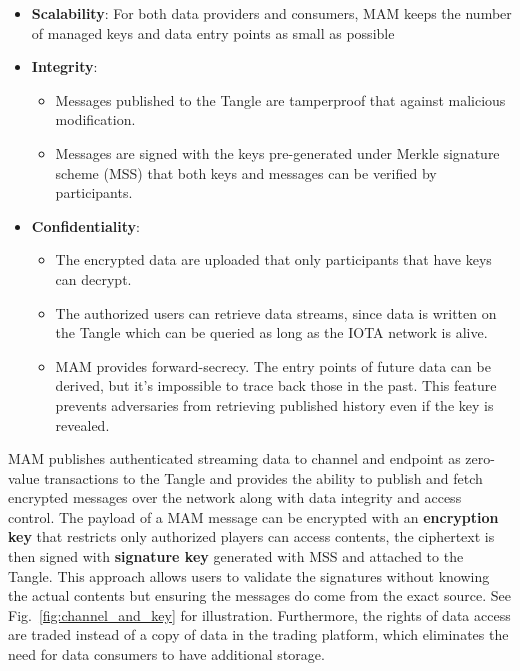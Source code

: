 \documentclass[conference]{IEEEtran}
\begin{document}
\begin{itemize}
    \item \textbf{Scalability}: For both data providers and consumers, MAM keeps the number of managed keys and data entry points as small as possible
    \item \textbf{Integrity}: 
	\begin{itemize}    	
    	\item Messages published to the Tangle are tamperproof that against malicious modification. 
    	\item Messages are signed with the keys pre-generated under Merkle signature scheme\cite{MSS} (MSS) that both keys and messages can be verified by participants.
    \end{itemize}
    \item \textbf{Confidentiality}:
    \begin{itemize}    	
    	\item The encrypted data are uploaded that only participants that have keys can decrypt. 
    	\item The authorized users can retrieve data streams, since data is written on the Tangle which can be queried as long as the IOTA network is alive.
    	\item MAM provides forward-secrecy. The entry points of future data can be derived, but it's impossible to trace back those in the past. This feature prevents adversaries from retrieving published history even if the key is revealed.
    \end{itemize}
\end{itemize}

MAM publishes authenticated streaming data to channel and endpoint as zero-value transactions to the Tangle and provides the ability to publish and fetch encrypted messages over the network along with data integrity and access control. The payload of a MAM message can be encrypted with an \textbf{encryption key} that restricts only authorized players can access contents, the ciphertext is then signed with \textbf{signature key} generated with MSS and attached to the Tangle. This approach allows users to validate the signatures without knowing the actual contents but ensuring the messages do come from the exact source. See Fig.~\ref{fig:channel_and_key} for illustration. Furthermore, the rights of data access are traded instead of a copy of data in the trading platform, which eliminates the need for data consumers to have additional storage. 

\end{document}

